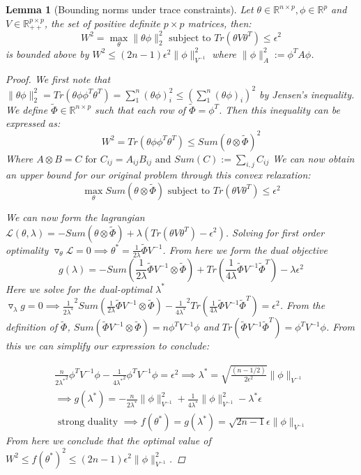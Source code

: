 \documentclass{article}
\newtheorem{lemma}{Lemma}
\newcommand{\Real}{\mathds{R}}
\begin{document}
\begin{lemma}[Bounding norms under trace constraints]
\label{lem: norms trace} \hspace{0.000000001mm} \newline
Let $\theta \in \Real^{n \times p}, \phi \in \Real^p$ and $V \in \Real_{++}^{p \times p}$, the set of positive definite $p\times p$ matrices, then:
$$ W^2  = \max_\theta \|\theta \phi \|_2^2  \text{ subject to } Tr(\theta V \theta^T) \le \epsilon^2 $$
is bounded above by $W^2 \le (2n-1) \epsilon^2 \| \phi \|^2_{V^{-1}}$ where $\| \phi \|_A^2 := \phi^T A \phi$.

\begin{proof}
We first note that $ \|\theta \phi \|_2^2 = Tr(\theta \phi \phi^T \theta^T) = \sum_1^n (\theta \phi)_i^2 \le \left( \sum_1^n (\theta \phi)_i \right)^2 $ by Jensen's inequality.
We define $\tilde{\Phi} \in \Real^{n \times p}$ such that each row of  $\tilde{\Phi} = \phi^T $. Then this inequality can be expressed as:
$$ W^2 = Tr(\theta \phi \phi^T \theta^T) \le Sum ( \theta \otimes \tilde{\Phi} )^2 $$
Where  $A\otimes B = C \text{ for } C_{ij} = A_{ij}B_{ij} \text{ and }Sum(C) := \sum_{i,j}C_{ij} $
We can now obtain an upper bound for our original problem through this convex relaxation:
$$ \max_\theta Sum ( \theta \otimes \tilde{\Phi} ) \text{ subject to } Tr(\theta V \theta^T) \le \epsilon^2 $$

We can now form the lagrangian $\mathcal{L}(\theta, \lambda) = -Sum ( \theta \otimes \tilde{\Phi} ) + \lambda ( Tr(\theta V \theta^T) - \epsilon^2)$.
Solving for first order optimality $\triangledown_\theta \mathcal{L} = 0 \implies \theta^* = \frac{1}{2\lambda} \tilde{\Phi} V^{-1}$.
From here we form the dual objective
$$g(\lambda) = -Sum (\frac{1}{2\lambda}\tilde{\Phi}V^{-1} \otimes \tilde{\Phi}) +
	Tr(\frac{1}{4\lambda}\tilde{\Phi}V^{-1}\tilde{\Phi}^T) - \lambda \epsilon^2$$
Here we solve for the dual-optimal $\lambda^*$
$\triangledown_\lambda g = 0 \implies  \frac{1}{2{\lambda^*}}^2 Sum (\frac{1}{2\lambda}\tilde{\Phi}V^{-1} \otimes \tilde{\Phi})
	-  \frac{1}{4{\lambda^*}}^2 Tr(\frac{1}{4\lambda}\tilde{\Phi}V^{-1}\tilde{\Phi}^T) = \epsilon^2$.
From the definition of $\tilde{\Phi}$,
$Sum ( \tilde{\Phi}V^{-1} \otimes \tilde{\Phi} ) = n \phi^T V^{-1} \phi$ and $Tr(\tilde{\Phi}V^{-1}\tilde{\Phi}^T) = \phi^T V^{-1}\phi$.
From this we can simplify our expression to conclude:

\begin{eqnarray*}
	\frac{n}{2{\lambda^*}^2} \phi^T V^{-1} \phi - \frac{1}{4{\lambda^*}^2} \phi^T V^{-1} \phi = \epsilon^2 \implies {\lambda^*}
	= \sqrt{ \frac{(n-1/2)}{2\epsilon^2} } \| \phi \|_{V^{-1}} \\
	\implies g(\lambda^*) = -\frac{n}{2\lambda^*} \|\phi \|_{V^{-1}}^2 + \frac{1}{4\lambda^*} \|\phi \|_{V^{-1}}^2 - \lambda^* \epsilon \\
	\text{ strong duality } \implies f(\theta^*) = g(\lambda^*) = \sqrt{2n-1} \epsilon \| \phi \|_{V^{-1}}
\end{eqnarray*}
From here we conclude that the optimal value of $W^2 \le f(\theta^*)^2 \le (2n-1) \epsilon^2 \|\phi\|_{V^{-1}}^2$.
\end{proof}
\end{lemma}
\end{document}
